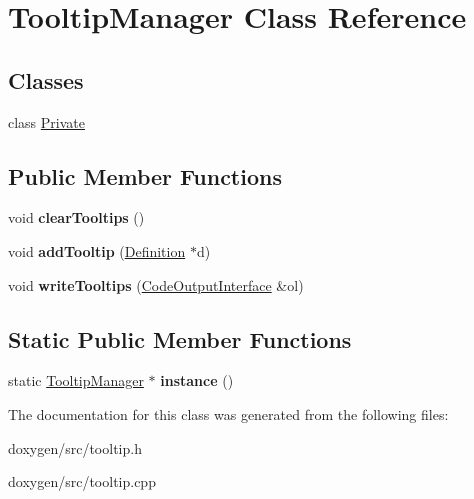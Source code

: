 \hypertarget{class_tooltip_manager}{}\section{Tooltip\+Manager Class Reference}
\label{class_tooltip_manager}
\subsection*{Classes}
\begin{DoxyCompactItemize}
\item 
class \mbox{\hyperlink{class_tooltip_manager_1_1_private}{Private}}
\end{DoxyCompactItemize}
\subsection*{Public Member Functions}
\begin{DoxyCompactItemize}
\item 
\mbox{\label{class_tooltip_manager_a74bf580759060521d8f930f5669cc3b7}} 
void {\bfseries clear\+Tooltips} ()
\item 
\mbox{\label{class_tooltip_manager_adda422b4a295ce3e723291b4a1154533}} 
void {\bfseries add\+Tooltip} (\mbox{\hyperlink{class_definition}{Definition}} $\ast$d)
\item 
\mbox{\label{class_tooltip_manager_a48d73e6c7d74b366a7370df036846a51}} 
void {\bfseries write\+Tooltips} (\mbox{\hyperlink{class_code_output_interface}{Code\+Output\+Interface}} \&ol)
\end{DoxyCompactItemize}
\subsection*{Static Public Member Functions}
\begin{DoxyCompactItemize}
\item 
\mbox{\label{class_tooltip_manager_ab5591eec8d704069b5ef732514e378a1}} 
static \mbox{\hyperlink{class_tooltip_manager}{Tooltip\+Manager}} $\ast$ {\bfseries instance} ()
\end{DoxyCompactItemize}


The documentation for this class was generated from the following files\+:\begin{DoxyCompactItemize}
\item 
doxygen/src/tooltip.\+h\item 
doxygen/src/tooltip.\+cpp\end{DoxyCompactItemize}
